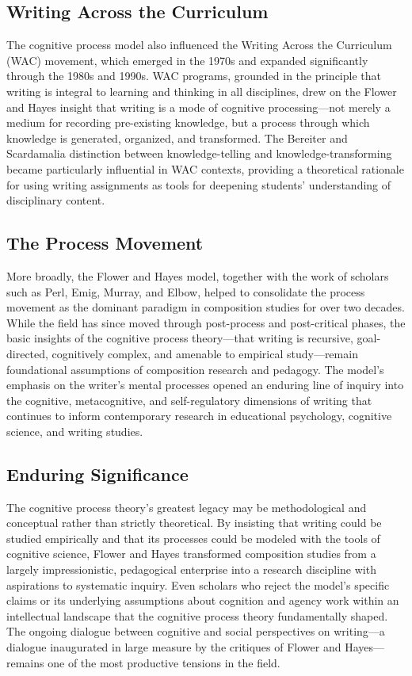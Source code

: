 \documentclass[12pt]{article}
\begin{document}
\subsection{Writing Across the Curriculum}

The cognitive process model also influenced the Writing Across the Curriculum (WAC) movement, which emerged in the 1970s and expanded significantly through the 1980s and 1990s. WAC programs, grounded in the principle that writing is integral to learning and thinking in all disciplines, drew on the Flower and Hayes insight that writing is a mode of cognitive processing---not merely a medium for recording pre-existing knowledge, but a process through which knowledge is generated, organized, and transformed. The Bereiter and Scardamalia distinction between knowledge-telling and knowledge-transforming became particularly influential in WAC contexts, providing a theoretical rationale for using writing assignments as tools for deepening students' understanding of disciplinary content.

\subsection{The Process Movement}

More broadly, the Flower and Hayes model, together with the work of scholars such as Perl, Emig, Murray, and Elbow, helped to consolidate the process movement as the dominant paradigm in composition studies for over two decades. While the field has since moved through post-process and post-critical phases, the basic insights of the cognitive process theory---that writing is recursive, goal-directed, cognitively complex, and amenable to empirical study---remain foundational assumptions of composition research and pedagogy. The model's emphasis on the writer's mental processes opened an enduring line of inquiry into the cognitive, metacognitive, and self-regulatory dimensions of writing that continues to inform contemporary research in educational psychology, cognitive science, and writing studies.

\subsection{Enduring Significance}

The cognitive process theory's greatest legacy may be methodological and conceptual rather than strictly theoretical. By insisting that writing could be studied empirically and that its processes could be modeled with the tools of cognitive science, Flower and Hayes transformed composition studies from a largely impressionistic, pedagogical enterprise into a research discipline with aspirations to systematic inquiry. Even scholars who reject the model's specific claims or its underlying assumptions about cognition and agency work within an intellectual landscape that the cognitive process theory fundamentally shaped. The ongoing dialogue between cognitive and social perspectives on writing---a dialogue inaugurated in large measure by the critiques of Flower and Hayes---remains one of the most productive tensions in the field.
\end{document}
